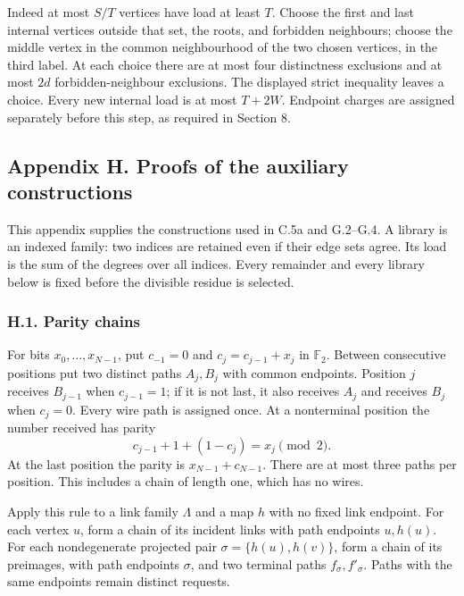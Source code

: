 \documentclass[english,11pt,a4paper]{article}
\begin{document}
Indeed at most \(S/T\) vertices have load at least \(T\). Choose the first and last internal vertices outside that set, the roots, and forbidden neighbours; choose the middle vertex in the common neighbourhood of the two chosen vertices, in the third label. At each choice there are at most four distinctness exclusions and at most \(2d\) forbidden-neighbour exclusions. The displayed strict inequality leaves a choice. Every new internal load is at most \(T+2W\). Endpoint charges are assigned separately before this step, as required in Section 8.

\clearpage

\subsection{Appendix H. Proofs of the auxiliary constructions}\label{appendix-h.-proofs-of-the-auxiliary-constructions}

This appendix supplies the constructions used in C.5a and G.2--G.4. A library is an indexed family: two indices are retained even if their edge sets agree. Its load is the sum of the degrees over all indices. Every remainder and every library below is fixed before the divisible residue is selected.

\subsubsection{H.1. Parity chains}\label{h.1.-parity-chains}

For bits \(x_0,\ldots,x_{N-1}\), put \(c_{-1}=0\) and \(c_j=c_{j-1}+x_j\) in \(\mathbb F_2\). Between consecutive positions put two distinct paths \(A_j,B_j\) with common endpoints. Position \(j\) receives \(B_{j-1}\) when \(c_{j-1}=1\); if it is not last, it also receives \(A_j\) and receives \(B_j\) when \(c_j=0\). Every wire path is assigned once. At a nonterminal position the number received has parity \[c_{j-1}+1+(1-c_j)=x_j\pmod2.\] At the last position the parity is \(x_{N-1}+c_{N-1}\). There are at most three paths per position. This includes a chain of length one, which has no wires.

Apply this rule to a link family \(\Lambda\) and a map \(h\) with no fixed link endpoint. For each vertex \(u\), form a chain of its incident links with path endpoints \(u,h(u)\). For each nondegenerate projected pair \(\sigma=\{h(u),h(v)\}\), form a chain of its preimages, with path endpoints \(\sigma\), and two terminal paths \(f_\sigma,f'_\sigma\). Paths with the same endpoints remain distinct requests.
\end{document}
